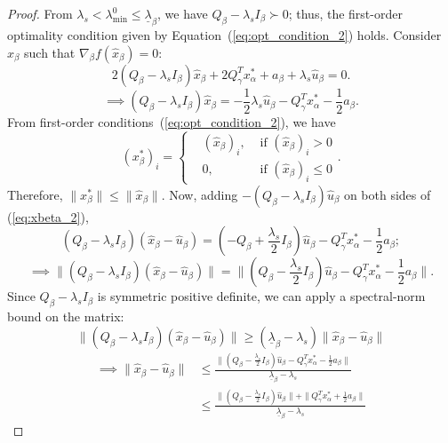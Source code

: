 \documentclass[]{article}
\begin{document}
\begin{proof}
    From $\lambda_s<\lambda_{\min}^0 \leq \underline{\lambda}_\beta$, we have $Q_\beta-\lambda_sI_\beta \succ 0$; thus, the first-order optimality condition given by Equation~(\ref{eq:opt_condition_2}) holds. Consider $\hat{x}_\beta$ such that $\nabla_{\beta} f(\hat{x}_\beta) = 0$:
    \[2(Q_\beta- \lambda_s I_\beta)\hat{x}_\beta + 2Q_\gamma^T x_\alpha^* + a_\beta+\lambda_s\hat{u}_\beta = 0.\]
    \begin{equation}\label{eq:xbeta_2}
        \implies (Q_\beta- \lambda_sI_\beta)\hat{x}_\beta =  -\frac{1}{2}\lambda_s\hat{u}_\beta-Q_\gamma^T x_\alpha^* - \frac{1}{2}a_\beta.
    \end{equation}
    From first-order conditions~(\ref{eq:opt_condition_2}), we have
    \begin{equation}\label{eq:hat_opt}
            (x^*_\beta)_i = \left \{ \begin{aligned}&(\hat{x}_\beta)_i, &\mbox{ if } (\hat{x}_\beta)_i > 0\\
            &0, &\mbox{ if } (\hat{x}_\beta)_i \leq 0
            \end{aligned}\right. .
    \end{equation}
    Therefore, $\|x^*_\beta\| \leq \|\hat{x}_\beta\|$. Now, adding $-(Q_\beta -\lambda_sI_\beta)\hat{u}_\beta$ on both sides of (\ref{eq:xbeta_2}),
    \[(Q_\beta-\lambda_sI_\beta)(\hat{x}_\beta-\hat{u}_\beta) = (-Q_\beta+\frac{\lambda_s}{2}I_\beta)\hat{u}_\beta-Q_\gamma^T x_\alpha^* - \frac{1}{2}a_\beta;\]
    \[\implies \|(Q_\beta-\lambda_sI_\beta)(\hat{x}_\beta-\hat{u}_\beta)\| = \|(Q_\beta-\frac{\lambda_s}{2}I_\beta)\hat{u}_\beta-Q_\gamma^T x_\alpha^* - \frac{1}{2}a_\beta\|.\]
    Since $Q_\beta-\lambda_sI_\beta $ is symmetric positive definite, we can apply a spectral-norm bound on the matrix:
    \[\|(Q_\beta-\lambda_sI_\beta)(\hat{x}_\beta-\hat{u}_\beta)\|\geq (\underline{\lambda}_\beta-\lambda_s)\|\hat{x}_\beta-\hat{u}_\beta\|\]
    \begin{equation}\label{eq:thm1_condition}
        \begin{aligned}
            \implies \|\hat{x}_\beta-\hat{u}_\beta\| &\leq \frac{\|(Q_\beta-\frac{\lambda_s}{2}I_\beta)\hat{u}_\beta-Q_\gamma^T x_\alpha^* - \frac{1}{2}a_\beta\|}{\underline{\lambda}_\beta-\lambda_s}\\
            &\leq \frac{\|(Q_\beta-\frac{\lambda_s}{2}I_\beta)\hat{u}_\beta\| + \|Q_\gamma^T x_\alpha^* + \frac{1}{2}a_\beta\|}{\underline{\lambda}_\beta-\lambda_s}
        \end{aligned}

\end{equation}
\end{proof}
\end{document}
